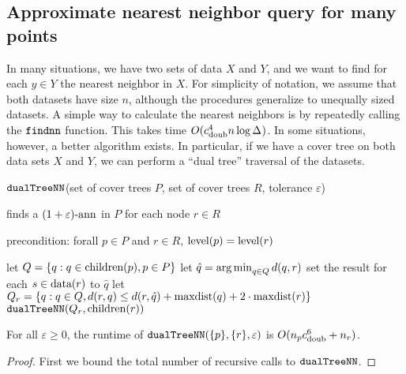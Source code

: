\documentclass[../main.tex]{subfiles}
\makeatletter
\newcommand{\dist}[2]{\distf({#1},{#2})}
\newcommand{\distf}{d}
\newcommand{\aspect}[1]{\Delta_{#1}}
\newcommand{\cdoub}{c_\textnormal{doub}}
\newcommand{\mkfunction}[1]{\ifmmode{\textnormal{{#1}}}}
\newcommand{\level}[1]      {\mkfunction{level}({#1})}
\newcommand{\children}[1]   {\mkfunction{children}({#1})}
\newcommand{\covdist}[1]    {\mkfunction{covdist}({#1})}
\newcommand{\maxdist}[1]    {\mkfunction{maxdist}({#1})}
\newcommand{\data}[1]       {\mkfunction{data}({#1})}
\newcommand{\nn}[1]         {\mkfunction{nn}[{#1}]}
\def\nn{\@ifstar\@nn\@@nn}
\def\@nn#1{\mkfunction{nn}^*[{#1}]}
\def\@@nn#1{\mkfunction{nn}[{#1}]}
\newcommand{\mkprocedure}[1]{\textnormal{\ttfamily {#1}}}
\newcommand{\findnn}{\mkprocedure{findnn}}
\newcommand{\dualnn}{\ensuremath{\textnormal{\ttfamily dualTreeNN}}}
\makeatother
\begin{document}

\subsection{Approximate nearest neighbor query for many points}

In many situations, we have two sets of data $X$ and $Y$,
and we want to find for each $y\in Y$ the nearest neighbor in $X$.
For simplicity of notation, we assume that both datasets have size $n$,
although the procedures generalize to unequally sized datasets.
A simple way to calculate the nearest neighbors is by repeatedly calling the $\findnn$ function.
This takes time $O(\cdoub^4 n\log \aspect{})$.
In some situations, however, a better algorithm exists.
In particular, if we have a cover tree on both data sets $X$ and $Y$,
we can perform a ``dual tree'' traversal of the datasets.


\newpage
\begin{algorithm}[h]
    \caption{$\dualnn$(set of cover trees $P$, set of cover trees $R$, tolerance $\varepsilon$)}
\vspace{0.1in}
finds a $(1+\varepsilon)\text{-ann}$ in $P$ for each node $r\in R$

precondition: forall $p\in P$ and $r \in R$, $\level p = \level r$
\begin{algorithmic}[1]
    \State let $Q = \{ q: q \in \children p, p\in P \}$
        \State let $\hat q = \argmin_{q\in Q} \dist{q}{r}$
        \If {$Q = \{\hat q\}$ \textbf{or} $\dist{x}{\hat q} \ge 2\cdot\covdist{\hat q}(1+1/\varepsilon)$}
            \label{line:dualnnorig:if}
            \State set the result for each $s\in\data r$ to $\hat q$
        \Else
            \State let $Q_r = \{ q : q \in Q, \dist{r}{q} \le \dist{r}{\hat q} + \maxdist{q} + 2\cdot \maxdist{r} \}$
            \State $\dualnn(Q_r,\children r)$
        \EndIf
    \EndFor
\end{algorithmic}
\end{algorithm}

\begin{theorem}
    For all $\varepsilon \ge 0$,
    the runtime of $\dualnn(\{p\}, \{r\}, \varepsilon)$ is $O(n_p\cdoub^6+n_r)$.
\end{theorem}
\begin{proof}
    First we bound the total number of recursive calls to $\dualnn$. 

\end{proof}
\end{document}
